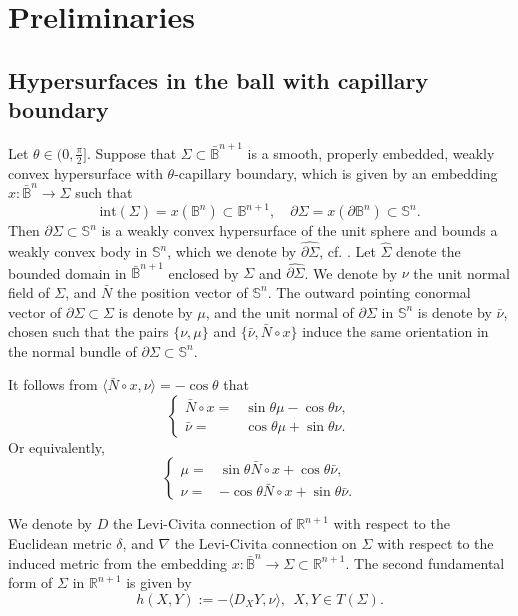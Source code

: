 \documentclass[11pt,reqno]{amsart}
\theoremstyle{definition}
\theoremstyle{remark}
\numberwithin{equation}{section}
\renewcommand{\(}{\left(}
\renewcommand{\)}{\right)}
\renewcommand{\-}{\overline}
\renewcommand{\t}{\theta}
\newcommand{\ra}{\rightarrow}
\begin{document}
\section{Preliminaries}\label{Sec-pre}
\subsection{Hypersurfaces in the ball with capillary boundary} 
Let $\theta\in (0,\frac{\pi}{2}]$. Suppose that $\Sigma\subset\bar{\mathbb{B}}^{n+1}$ is a smooth, properly embedded, weakly convex hypersurface with $\theta$-capillary boundary, which is given by an embedding $x:\bar{\mathbb B}^n\ra \Sigma$ such that
$$
\mathrm{int}(\Sigma)=x({\mathbb B}^{n}) \subset \mathbb B^{n+1}, \quad \partial \Sigma=x(\partial \mathbb B^{n})\subset \mathbb S^n.
$$
Then $\partial\Sigma\subset\mathbb{S}^{n}$ is a weakly convex hypersurface of the unit sphere and bounds a weakly convex body in $\mathbb{S}^n$, which we denote by $\widehat{\partial\Sigma}$, cf. \cite[Theorem 1.1]{CW1970}. Let $\widehat{\Sigma}$ denote  the bounded domain in $\bar{\mathbb{B}}^{n+1}$ enclosed by $\Sigma$ and $\widehat{\partial\Sigma}$. We denote by $\nu$ the unit normal field of $\Sigma$, and $\bar{N}$ the position vector of $\mathbb{S}^n$. The outward pointing conormal vector of $\partial\Sigma\subset\Sigma$ is denote by $\mu$, and the unit normal of $\partial \Sigma$ in $\mathbb{S}^n$ is denote by $\bar{\nu}$, chosen such that the pairs $\{\nu,\mu\}$ and $\{\bar{\nu},\bar{N}\circ x\}$ induce the same orientation in the normal bundle of $\partial\Sigma\subset\mathbb{S}^n$.

It follows from $\langle \bar{N}\circ x,\nu\rangle=-\cos \t$ that
\begin{equation}\label{normal transform}
	\left\{\begin{aligned}
		\bar{N}\circ x=&\sin\theta\mu-\cos\theta\nu,\\
		\bar{\nu}=&\cos\theta\mu+\sin\theta\nu.
	\end{aligned}\right.
\end{equation}
Or equivalently,
\begin{equation}\label{normal transform-II}
\left\{\begin{aligned}
	\mu=&\sin\t \bar{N} \circ x+\cos\t \bar{\nu},\\
	\nu=&-\cos\t \bar{N}\circ x+\sin\t \bar{\nu}.
	\end{aligned}\right.
\end{equation}

We denote by $D$ the Levi-Civita connection of $\mathbb R^{n+1}$ with respect to the Euclidean metric $\delta$, and $\nabla$ the Levi-Civita connection on $\Sigma$ with respect to the induced metric from the embedding $x:\bar{\mathbb B}^n \to \Sigma \subset \mathbb R^{n+1}$. The second fundamental form of $\Sigma$ in $\mathbb R^{n+1}$ is given by
\begin{equation*}
	h(X,Y):=-\langle D_X Y,\nu\rangle,\ \ X,Y\in T(\Sigma).
\end{equation*}
\end{document}
